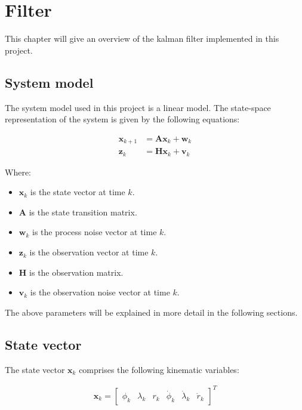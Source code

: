 \chapter{Filter}\label{ch:filter}
This chapter will give an overview of the kalman filter implemented in this project.


\section{System model}\label{sec:system-model}
The system model used in this project is a linear model.
The state-space representation of the system is given by the following equations:

\begin{align}
    \mathbf{x}_{k+1} &= \mathbf{A}\mathbf{x}_k + \mathbf{w}_k\\
    \mathbf{z}_k &= \mathbf{H}\mathbf{x}_k + \mathbf{v}_k
\end{align}

Where:
\begin{itemize}
    \item $\mathbf{x}_k$ is the state vector at time $k$.
    \item $\mathbf{A}$ is the state transition matrix.
    \item $\mathbf{w}_k$ is the process noise vector at time $k$.
    \item $\mathbf{z}_k$ is the observation vector at time $k$.
    \item $\mathbf{H}$ is the observation matrix.
    \item $\mathbf{v}_k$ is the observation noise vector at time $k$.
\end{itemize}

The above parameters will be explained in more detail in the following sections.


\section{State vector}\label{sec:state-vector}
The state vector $\mathbf{x}_k$ comprises the following kinematic variables:

\begin{align}
    \mathbf{x}_k =
    \begin{bmatrix}
       \phi_k          &
       \lambda_k       &
       r_k             &
       \dot{\phi}_k    &
       \dot{\lambda}_k &
       \dot{r}_k
    \end{bmatrix}^T
\end{align}

